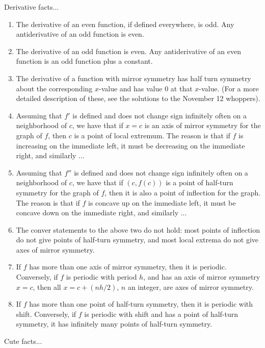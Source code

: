 \documentclass[10pt]{amsart}
\begin{document}
Derivative facts...

\begin{enumerate}
\item The derivative of an even function, if defined everywhere, is
  odd. Any antiderivative of an odd function is even.
\item The derivative of an odd function is even. Any antiderivative of
  an even function is an odd function plus a constant.
\item The derivative of a function with mirror symmetry has half turn
  symmetry about the corresponding $x$-value and has value $0$ at that
  $x$-value. (For a more detailed description of these, see the
  solutions to the November 12 whoppers).
\item Assuming that $f'$ is defined and does not change sign
  infinitely often on a neighborhood of $c$, we have that if $x = c$
  is an axis of mirror symmetry for the graph of $f$, then $c$ is a
  point of local extremum. The reason is that if $f$ is increasing on
  the immediate left, it must be decreasing on the immediate right,
  and similarly ...
\item Assuming that $f''$ is defined and does not change sign
  infinitely often on a neighborhood of $c$, we have that if
  $(c,f(c))$ is a point of half-turn symmetry for the graph of $f$,
  then it is also a point of inflection for the graph. The reason is
  that if $f$ is concave up on the immediate left, it must be concave
  down on the immediate right, and similarly ...
\item The conver statements to the above two do not hold: most points
  of inflection do not give points of half-turn symmetry, and most
  local extrema do not give axes of mirror symmetry.
\item If $f$ has more than one axis of mirror symmetry, then it is
  periodic. Conversely, if $f$ is periodic with period $h$, and has an
  axis of mirror symmetry $x = c$, then all $x = c + (nh/2)$, $n$ an
  integer, are axes of mirror symmetry.
\item If $f$ has more than one point of half-turn symmetry, then it is
  periodic with shift. Conversely, if $f$ is periodic with shift and
  has a point of half-turn symmetry, it has infinitely many points of
  half-turn symmetry.
\end{enumerate}

Cute facts...
\end{document}
